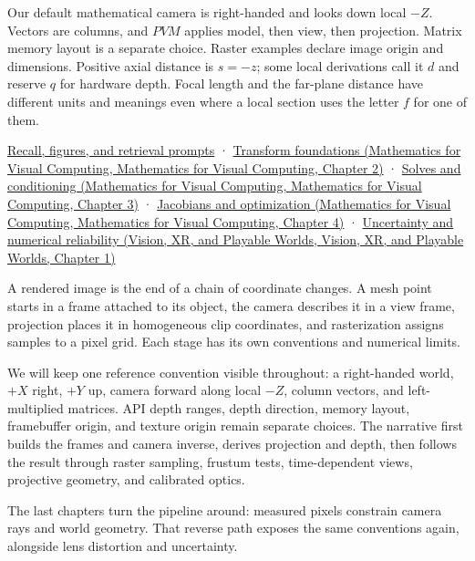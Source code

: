 Our default mathematical camera is right-handed and looks down local \(-Z\). Vectors are columns, and \(PVM\) applies model, then view, then projection. Matrix memory layout is a separate choice. Raster examples declare image origin and dimensions. Positive axial distance is \(s=-z\); some local derivations call it \(d\) and reserve \(q\) for hardware depth. Focal length and the far-plane distance have different units and meanings even where a local section uses the letter \(f\) for one of them.

\hyperref[appendix-a2b71a18f5a2]{Recall, figures, and retrieval prompts} · \href{../02-Mathematics-for-Visual-Computing/main.pdf\#nameddest=01-foundations-i-ch018-keep-the-promises-visible-while-moving-between-representations}{Transform foundations (Mathematics for Visual Computing, Mathematics for Visual Computing, Chapter 2)} · \href{../02-Mathematics-for-Visual-Computing/main.pdf\#nameddest=01-foundations-i-ch019-the-graphics-problem-hiding-inside-a-matrix-equation}{Solves and conditioning (Mathematics for Visual Computing, Mathematics for Visual Computing, Chapter 3)} · \href{../02-Mathematics-for-Visual-Computing/main.pdf\#nameddest=01-foundations-i-ch020-functions-limits-continuity-and-scalar-change}{Jacobians and optimization (Mathematics for Visual Computing, Mathematics for Visual Computing, Chapter 4)} · \href{../07-Vision-XR-and-Playable-Worlds/main.pdf\#nameddest=02-foundations-ii-ch039-learning-route}{Uncertainty and numerical reliability (Vision, XR, and Playable Worlds, Vision, XR, and Playable Worlds, Chapter 1)}

A rendered image is the end of a chain of coordinate changes. A mesh point starts in a frame attached to its object, the camera describes it in a view frame, projection places it in homogeneous clip coordinates, and rasterization assigns samples to a pixel grid. Each stage has its own conventions and numerical limits.

We will keep one reference convention visible throughout: a right-handed world, \(+X\) right, \(+Y\) up, camera forward along local \(-Z\), column vectors, and left-multiplied matrices. API depth ranges, depth direction, memory layout, framebuffer origin, and texture origin remain separate choices. The narrative first builds the frames and camera inverse, derives projection and depth, then follows the result through raster sampling, frustum tests, time-dependent views, projective geometry, and calibrated optics.

The last chapters turn the pipeline around: measured pixels constrain camera rays and world geometry. That reverse path exposes the same conventions again, alongside lens distortion and uncertainty.

